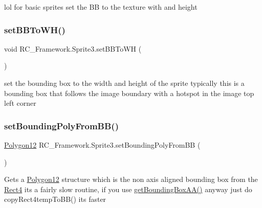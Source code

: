 lol for basic sprites set the BB to the texture with and height 

\mbox{\label{class_r_c___framework_1_1_sprite3_aca02729a3919f4f31c4c63f814ea0150}} 
\subsubsection{\texorpdfstring{set\+B\+B\+To\+W\+H()}{setBBToWH()}}
{\footnotesize\ttfamily void R\+C\+\_\+\+Framework.\+Sprite3.\+set\+B\+B\+To\+WH (\begin{DoxyParamCaption}{ }\end{DoxyParamCaption})}



set the bounding box to the width and height of the sprite typically this is a bounding box that follows the image boundary with a hotspot in the image top left corner 

\mbox{\label{class_r_c___framework_1_1_sprite3_a9ed1e862b6f3f6a28f65b5c53fbb34e1}} 
\subsubsection{\texorpdfstring{set\+Bounding\+Poly\+From\+B\+B()}{setBoundingPolyFromBB()}}
{\footnotesize\ttfamily \mbox{\hyperlink{class_r_c___framework_1_1_polygon12}{Polygon12}} R\+C\+\_\+\+Framework.\+Sprite3.\+set\+Bounding\+Poly\+From\+BB (\begin{DoxyParamCaption}{ }\end{DoxyParamCaption})}



Gets a \mbox{\hyperlink{class_r_c___framework_1_1_polygon12}{Polygon12}} structure which is the non axis aligned bounding box from the \mbox{\hyperlink{class_r_c___framework_1_1_rect4}{Rect4}} its a fairly slow routine, if you use \mbox{\hyperlink{class_r_c___framework_1_1_sprite3_a1069512793423e1c5f3205d053e11d66}{get\+Bounding\+Box\+A\+A()}} anyway just do copy\+Rect4temp\+To\+B\+B() its faster 

